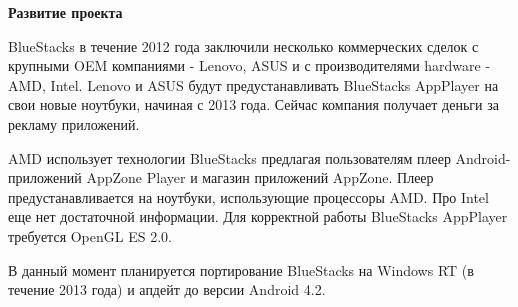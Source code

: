 {\bf Развитие проекта}

BlueStacks в течение 2012 года заключили несколько коммерческих сделок с крупными OEM компаниями - Lenovo, ASUS и с производителями hardware - AMD, Intel. Lenovo и ASUS будут предустанавливать BlueStacks AppPlayer на свои новые ноутбуки, начиная с 2013 года. Сейчас компания получает деньги за рекламу приложений.

AMD использует технологии BlueStacks предлагая пользователям плеер Android-приложений AppZone Player и магазин приложений AppZone. Плеер предустанавливается на ноутбуки, использующие процессоры AMD. Про Intel еще нет достаточной информации. Для корректной работы BlueStacks AppPlayer требуется OpenGL ES 2.0.

В данный момент планируется портирование BlueStacks на Windows RT (в течение 2013 года) и апдейт до версии Android 4.2.




